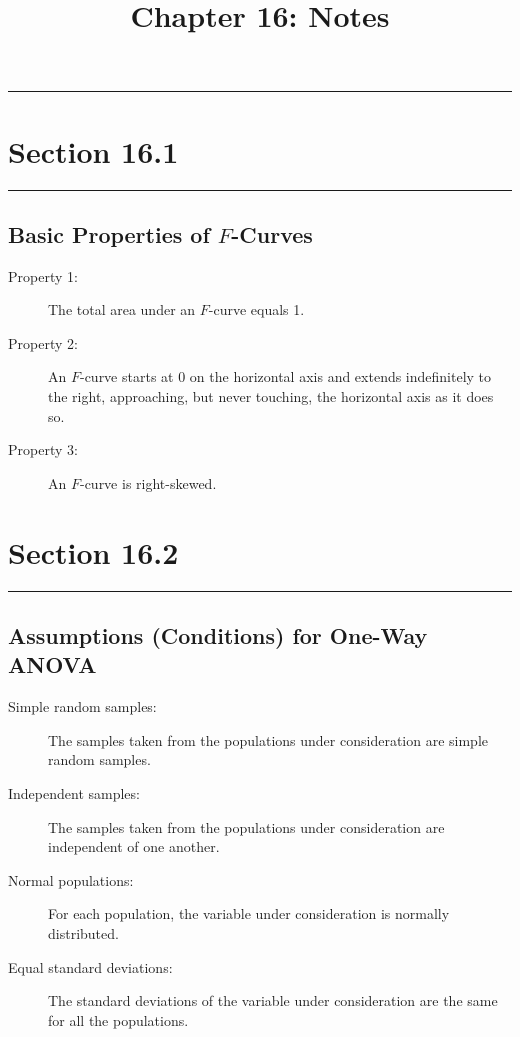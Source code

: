 \documentclass[12pt]{article}
\title{Chapter 16: Notes}
\author{}
\begin{document}
    \maketitle

    \noindent\rule{\textwidth}{0.4pt}
    \section*{Section 16.1}
    \noindent\rule{\textwidth}{0.4pt}
        \subsection*{Basic Properties of $F$-Curves}
            \begin{description}
                \item[Property 1:] The total area under an $F$-curve equals 1.
                \item[Property 2:] An $F$-curve starts at 0 on the horizontal axis and
                extends indefinitely to the right, approaching, but never touching, the
                horizontal axis as it does so.
                \item[Property 3:] An $F$-curve is right-skewed. 
            \end{description}

    \section*{Section 16.2}
    \noindent\rule{\textwidth}{0.4pt}
        \subsection*{Assumptions (Conditions) for One-Way ANOVA}
            \begin{description}
                \item[Simple random samples:] The samples taken from the populations under
                consideration are simple random samples. 
                \item[Independent samples:] The samples taken from the populations under
                consideration are independent of one another.
                \item[Normal populations:] For each population, the variable under
                consideration is normally distributed.
                \item[Equal standard deviations:] The standard deviations of the variable
                under consideration are the same for all the populations.   
            \end{description}
\end{document}
